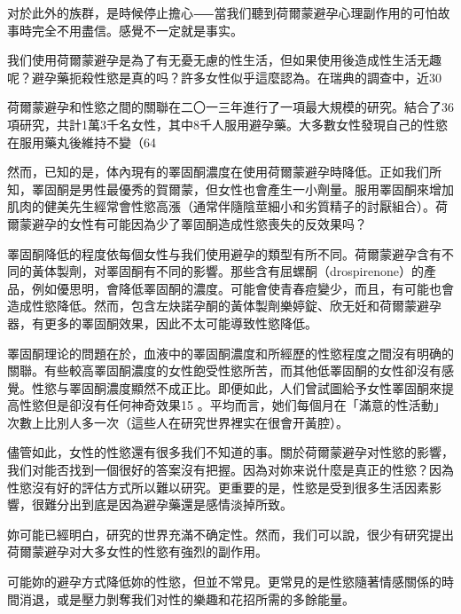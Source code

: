 \documentclass[12pt,UTF8]{ctexbook}
\begin{document}
对於此外的族群，是時候停止擔心⸺當我们聽到荷爾蒙避孕心理副作用的可怕故事時完全不用盡信。感覺不一定就是事实。

我们使用荷爾蒙避孕是為了有无憂无慮的性生活，但如果使用後造成性生活无趣呢？避孕藥扼殺性慾是真的吗？許多女性似乎這麼認為。在瑞典的調查中，近30%

荷爾蒙避孕和性慾之間的關聯在二〇一三年進行了一項最大規模的研究。結合了36項研究，共計1萬3千名女性，其中8千人服用避孕藥。大多數女性發現自己的性慾在服用藥丸後維持不變（64%

然而，已知的是，体內現有的睪固酮濃度在使用荷爾蒙避孕時降低。正如我们所知，睪固酮是男性最優秀的賀爾蒙，但女性也會產生一小劑量。服用睪固酮來增加肌肉的健美先生經常會性慾高漲（通常伴隨陰莖細小和劣質精子的討厭組合）。荷爾蒙避孕的女性有可能因為少了睪固酮造成性慾喪失的反效果吗？

睪固酮降低的程度依每個女性与我们使用避孕的類型有所不同。荷爾蒙避孕含有不同的黃体製劑，对睪固酮有不同的影響。那些含有屈螺酮（drospirenone）的產品，例如優思明，會降低睪固酮的濃度。可能會使青春痘變少，而且，有可能也會造成性慾降低。然而，包含左炔諾孕酮的黃体製劑樂婷錠、欣无妊和荷爾蒙避孕器，有更多的睪固酮效果，因此不太可能導致性慾降低。

睪固酮理论的問題在於，血液中的睪固酮濃度和所經歷的性慾程度之間沒有明确的關聯。有些較高睪固酮濃度的女性飽受性慾所苦，而其他低睪固酮的女性卻沒有感覺。性慾与睪固酮濃度顯然不成正比。即便如此，人们曾試圖給予女性睪固酮來提高性慾但是卻沒有任何神奇效果15 。平均而言，她们每個月在「滿意的性活動」次數上比別人多一次（這些人在研究世界裡实在很會开黃腔）。

儘管如此，女性的性慾還有很多我们不知道的事。關於荷爾蒙避孕对性慾的影響，我们对能否找到一個很好的答案沒有把握。因為对妳来说什麼是真正的性慾？因為性慾沒有好的評估方式所以難以研究。更重要的是，性慾是受到很多生活因素影響，很難分出到底是因為避孕藥還是感情淡掉所致。

妳可能已經明白，研究的世界充滿不确定性。然而，我们可以說，很少有研究提出荷爾蒙避孕对大多女性的性慾有強烈的副作用。

可能妳的避孕方式降低妳的性慾，但並不常見。更常見的是性慾隨著情感關係的時間消退，或是壓力剝奪我们对性的樂趣和花招所需的多餘能量。
\end{document}
